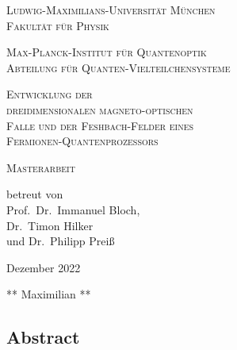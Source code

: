 \begin{titlepage}
    \vspace*{\fill}
    \centering

    \textsc{\Large Ludwig-Maximilians-Universität München}\\
    \textsc{Fakultät für Physik}

    \vspace{1cm}

    \textsc{\Large Max-Planck-Institut für Quantenoptik}\\
    \textsc{Abteilung für Quanten-Vielteilchensysteme}

    \vspace{2.1cm}

    \begin{minipage}{1\textwidth}
        \centering
            \textsc{\huge{
                Entwicklung der\\
                dreidimensionalen magneto-optischen\\
                Falle und der Feshbach-Felder eines\\
                Fermionen-Quantenprozessors\\
            }}
    \end{minipage}


    \vspace{2.1cm}
    \huge \textsc{Masterarbeit}



    \vspace{0.3cm}
    \large \textrm{betreut von\\Prof.~Dr.~Immanuel Bloch,\\Dr.~Timon Hilker\\und Dr.~Philipp Preiß}

    \vspace{1.5cm}
    \huge
    \textrm{Dezember 2022}

    \vspace{1.5cm}
    \Large \textrm{** Maximilian **}

    \vspace*{\fill}
\end{titlepage}

\begin{titlepage}
    \null\vspace{3cm}
    \centering
    \begin{minipage}{0.8\textwidth}
        \section*{Abstract}
        
    \end{minipage}
\end{titlepage}



\tableofcontents
\newpage
